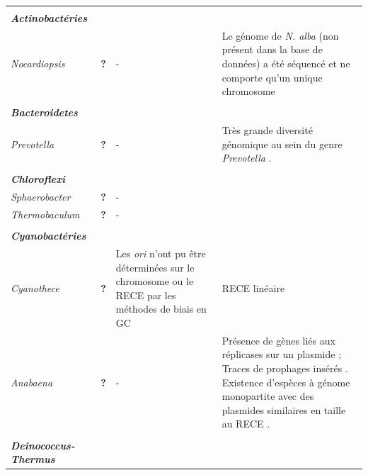 \begin{longtable}{@{\hspace{-2cm}} >{\footnotesize\itshape}p{} | >{\bfseries\scriptsize}p{} | >{\scriptsize}p{} | >{\scriptsize}p{} @{\hspace{0.5cm}}}
	\hline
	\multicolumn{1}{@{\hspace{-2cm}}} {} \\
     \multicolumn{1}{@{\hspace{-2cm}} p{0.15\textwidth}} {\textbf{Actinobactéries}}\\
	Nocardiopsis & ? & \centering - & Le génome de \textit{N. alba} (non présent dans la base de données) a été séquencé et ne comporte qu'un unique chromosome \citep{qiao2012whole} \\
     \hline
	\multicolumn{1}{@{\hspace{-2cm}}} {} \\
     \multicolumn{1}{@{\hspace{-2cm}} p{0.15\textwidth}} {\textbf{Bacteroidetes}}\\
     Prevotella & ? & \centering - & Très grande diversité génomique au sein du genre \textit{Prevotella} \citep{Purushe2010}.\\
     \hline
	\multicolumn{1}{@{\hspace{-2cm}}} {} \\
     \multicolumn{1}{@{\hspace{-2cm}} p{0.15\textwidth}} {\textbf{Chloroflexi}}\\
     Sphaerobacter & ? & \centering - & \multicolumn{1}{c}{-} \\
     \hline
     Thermobaculum & ? & \centering - &\multicolumn{1}{c}{-}\\
     \hline
	\multicolumn{1}{@{\hspace{-2cm}}} {} \\
	\multicolumn{1}{@{\hspace{-2cm}} p{0.15\textwidth}} {\textbf{Cyanobactéries}}\\
	Cyanothece & ? & Les \textit{ori} n'ont pu être déterminées sur le chromosome ou le RECE par les méthodes de biais en GC \citep{Welsh2008}& RECE linéaire \\
	\hline
	Anabaena & ? & \centering - & Présence de gènes liés aux réplicases sur un plasmide \citep{kaneko2001complete}; Traces de prophages insérés \citep{Wang2012a}. Existence d'espèces à génome monopartite avec des plasmides similaires en taille au RECE \citep{kaneko2001complete}. \\
	\hline
	\multicolumn{1}{@{\hspace{-2cm}}} {} \\
     \multicolumn{1}{@{\hspace{-2cm}} p{0.15\textwidth}} {\textbf{Deinococcus-Thermus}}\\

\end{longtable}
